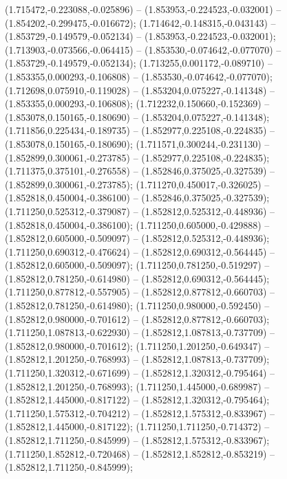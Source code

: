  (1.715472,-0.223088,-0.025896) -- (1.853953,-0.224523,-0.032001) -- (1.854202,-0.299475,-0.016672);
 (1.714642,-0.148315,-0.043143) -- (1.853729,-0.149579,-0.052134) -- (1.853953,-0.224523,-0.032001);
 (1.713903,-0.073566,-0.064415) -- (1.853530,-0.074642,-0.077070) -- (1.853729,-0.149579,-0.052134);
 (1.713255,0.001172,-0.089710) -- (1.853355,0.000293,-0.106808) -- (1.853530,-0.074642,-0.077070);
 (1.712698,0.075910,-0.119028) -- (1.853204,0.075227,-0.141348) -- (1.853355,0.000293,-0.106808);
 (1.712232,0.150660,-0.152369) -- (1.853078,0.150165,-0.180690) -- (1.853204,0.075227,-0.141348);
 (1.711856,0.225434,-0.189735) -- (1.852977,0.225108,-0.224835) -- (1.853078,0.150165,-0.180690);
 (1.711571,0.300244,-0.231130) -- (1.852899,0.300061,-0.273785) -- (1.852977,0.225108,-0.224835);
 (1.711375,0.375101,-0.276558) -- (1.852846,0.375025,-0.327539) -- (1.852899,0.300061,-0.273785);
 (1.711270,0.450017,-0.326025) -- (1.852818,0.450004,-0.386100) -- (1.852846,0.375025,-0.327539);
 (1.711250,0.525312,-0.379087) -- (1.852812,0.525312,-0.448936) -- (1.852818,0.450004,-0.386100);
 (1.711250,0.605000,-0.429888) -- (1.852812,0.605000,-0.509097) -- (1.852812,0.525312,-0.448936);
 (1.711250,0.690312,-0.476624) -- (1.852812,0.690312,-0.564445) -- (1.852812,0.605000,-0.509097);
 (1.711250,0.781250,-0.519297) -- (1.852812,0.781250,-0.614980) -- (1.852812,0.690312,-0.564445);
 (1.711250,0.877812,-0.557905) -- (1.852812,0.877812,-0.660703) -- (1.852812,0.781250,-0.614980);
 (1.711250,0.980000,-0.592450) -- (1.852812,0.980000,-0.701612) -- (1.852812,0.877812,-0.660703);
 (1.711250,1.087813,-0.622930) -- (1.852812,1.087813,-0.737709) -- (1.852812,0.980000,-0.701612);
 (1.711250,1.201250,-0.649347) -- (1.852812,1.201250,-0.768993) -- (1.852812,1.087813,-0.737709);
 (1.711250,1.320312,-0.671699) -- (1.852812,1.320312,-0.795464) -- (1.852812,1.201250,-0.768993);
 (1.711250,1.445000,-0.689987) -- (1.852812,1.445000,-0.817122) -- (1.852812,1.320312,-0.795464);
 (1.711250,1.575312,-0.704212) -- (1.852812,1.575312,-0.833967) -- (1.852812,1.445000,-0.817122);
 (1.711250,1.711250,-0.714372) -- (1.852812,1.711250,-0.845999) -- (1.852812,1.575312,-0.833967);
 (1.711250,1.852812,-0.720468) -- (1.852812,1.852812,-0.853219) -- (1.852812,1.711250,-0.845999);

